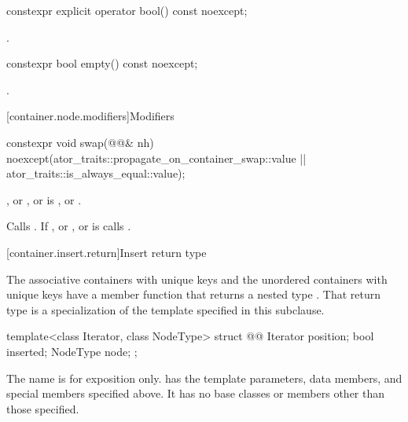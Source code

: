 \begin{itemdecl}
constexpr explicit operator bool() const noexcept;
\end{itemdecl}

\begin{itemdescr}
\pnum
\returns
{}.
\end{itemdescr}

\begin{itemdecl}
constexpr bool empty() const noexcept;
\end{itemdecl}

\begin{itemdescr}
\pnum
\returns
{}.
\end{itemdescr}

[container.node.modifiers]{Modifiers}

\begin{itemdecl}
constexpr void swap(@@& nh)
  noexcept(ator_traits::propagate_on_container_swap::value ||
           ator_traits::is_always_equal::value);
\end{itemdecl}

\begin{itemdescr}
\pnum
\expects
{}, or , or
 is ,
or .

\pnum
\effects
Calls . If , or
, or 
is  calls .
\end{itemdescr}

[container.insert.return]{Insert return type}

\pnum
The associative containers with unique keys and the unordered containers with unique keys
have a member function  that returns a nested type .
That return type is a specialization of the template specified in this subclause.

\begin{codeblock}
template<class Iterator, class NodeType>
struct @@
{
  Iterator position;
  bool     inserted;
  NodeType node;
};
\end{codeblock}

\pnum
The name  is for exposition only.
 has the template parameters,
data members, and special members specified above.
It has no base classes or members other than those specified.

